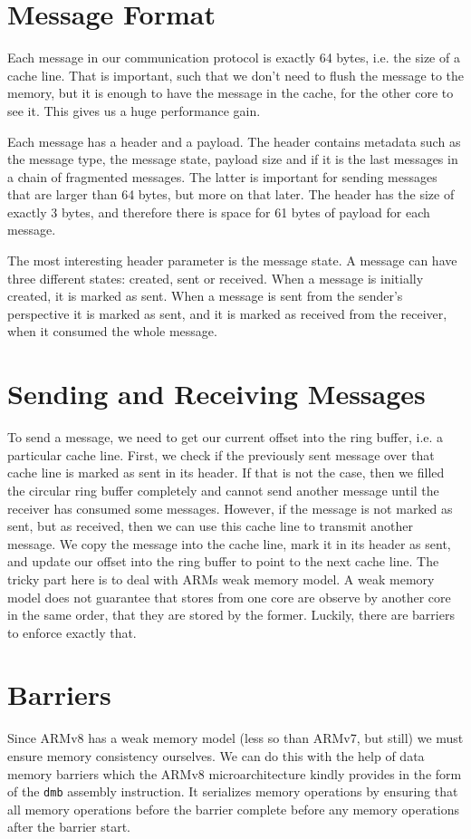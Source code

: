 \section{Message Format}

Each message in our communication protocol is exactly 64 bytes, i.e. the size of
a cache line. That is important, such that we don't need to flush the message to
the memory, but it is enough to have the message in the cache, for the other
core to see it. This gives us a huge performance gain.

Each message has a header and a payload. The header contains metadata such as
the message type, the message state, payload size and if it is the last messages
in a chain of fragmented messages. The latter is important for sending messages
that are larger than 64 bytes, but more on that later. The header has the size
of exactly 3 bytes, and therefore there is space for 61 bytes of payload for
each message.

The most interesting header parameter is the message state. A message can have
three different states: created, sent or received. When a message is initially
created, it is marked as sent. When a message is sent from the sender's
perspective it is marked as sent, and it is marked as received from the
receiver, when it consumed the whole message.

\section{Sending and Receiving Messages}

To send a message, we need to get our current offset into the ring buffer, i.e.
a particular cache line. First, we check if the previously sent message over
that cache line is marked as sent in its header. If that is not the case, then
we filled the circular ring buffer completely and cannot send another message
until the receiver has consumed some messages. However, if the message is not
marked as sent, but as received, then we can use this cache line to transmit
another message. We copy the message into the cache line, mark it in its header
as sent, and update our offset into the ring buffer to point to the next cache
line. The tricky part here is to deal with ARMs weak memory model. A weak
memory model does not guarantee that stores from one core are observe by
another core in the same order, that they are stored by the former. Luckily,
there are barriers to enforce exactly that.

\section{Barriers}
Since ARMv8 has a weak memory model (less so than ARMv7, but still) we must ensure
memory consistency ourselves. We can do this with the help of data memory barriers 
which the ARMv8 microarchitecture kindly provides in the form of the \texttt{dmb}
assembly instruction. It serializes memory operations by ensuring that all memory
operations before the barrier complete before any memory operations after the
barrier start.

